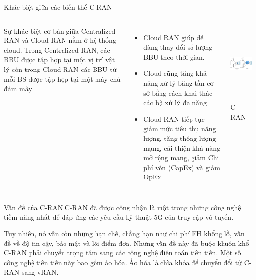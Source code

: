 \begin{frame}{Khác biệt giữa các biến thể C-RAN}
  \begin{columns}[T] %
      Sự khác biệt cơ bản giữa Centralized RAN và Cloud RAN nằm ở hệ thống cloud. Trong Centralized RAN, các BBU được tập hợp tại một vị trí vật lý còn trong Cloud RAN các BBU từ mỗi BS được tập hợp tại một máy chủ đám mây.
      \begin{itemize}
        \item Cloud RAN giúp dễ dàng thay đổi số lượng BBU theo thời gian.
        \item Cloud cũng tăng khả năng xử lý băng tần cơ sở bằng cách khai thác các bộ xử lý đa năng
        \item Cloud RAN tiếp tục giảm mức tiêu thụ năng lượng, tăng thông lượng mạng, cải thiện khả năng mở rộng mạng, giảm Chi phí vốn (CapEx) và giảm OpEx
      \end{itemize}

      \centering
      \vspace{0.3cm}
      \includegraphics[height=4cm, keepaspectratio]{picture/diff_C-RAN.png}
      \\[1ex]
      \small C-RAN 
  \end{columns}
\end{frame}

\begin{frame}{Vấn đề của C-RAN}
  C-RAN đã được công nhận là một trong những công nghệ tiềm năng nhất để đáp ứng các yêu cầu kỹ thuật 5G của truy cập vô tuyến. 


  \vspace{0.3cm}
  
  
  Tuy nhiên, nó vẫn còn những hạn chế, chẳng hạn như chi phí FH khổng lồ, vấn đề về độ tin cậy, bảo mật và lỗi điểm đơn. Những vấn đề này đã buộc khuôn khổ C-RAN phải chuyển trọng tâm sang các công nghệ điện toán tiên tiến. Một số công nghệ tiên tiến này bao gồm ảo hóa. Ảo hóa là chìa khóa để chuyển đổi từ C-RAN sang vRAN.

\end{frame}

